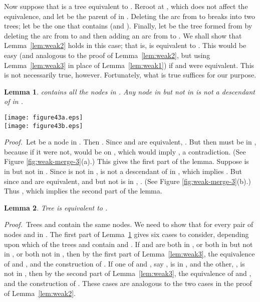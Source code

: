 \documentclass[twoside,leqno,twocolumn]{article}
\newtheorem{lemma}{Lemma}
\newcommand{\proof}{\noindent \emph{Proof.}\ }
\newcommand{\proofend}{\\}
\begin{document}
Now suppose that  is a tree equivalent to .  Reroot  at , which does not affect the equivalence, and let  be the parent of  in . Deleting the arc from  to  breaks  into two trees; let  be the one that contains  (and ).  Finally, let  be the tree formed from  by deleting the arc from  to  and then adding an arc from  to . We shall show that Lemma~\ref{lem:weak2} holds in this case; that is,  is equivalent to .  This would be easy (and analogous to the proof of Lemma~\ref{lem:weak2}, but using Lemma~\ref{lem:weak3} in place of Lemma~\ref{lem:weak1}) if  and  were equivalent.  This is not necessarily true, however.  Fortunately, what is true suffices for our purpose.

\begin{lemma}
\label{lem:weak4}  contains all the nodes in .  Any node in  but not in  is not a descendant of  in .
\end{lemma}

\begin{figure*}\begin{center}
\resizebox{.65\textwidth}{!} {\texttt{[image: figure43a.eps]}}\\
\vspace{1cm}
\resizebox{.65\textwidth}{!} {\texttt{[image: figure43b.eps]}}
\end{center}
\caption{\label{fig:weak-merge-3} Proof of Lemma~\ref{lem:weak4}.
Node ,  is the child of  in  that is an ancestor of , and  is the parent of  in .
(a) Assuming  is not in  implies , a contradiction. (b) If  is in  but not in  then
.}
\end{figure*}

\proof Let  be a node in . Then .  Since  and  are equivalent, .  But then  must be in , because if it were not,  would be on ,  which would imply
, a contradiction. (See Figure \ref{fig:weak-merge-3}(a).) This gives the first part of the lemma.  Suppose  is in  but not in .  Since  is not in ,  is not a descendant of  in , which implies .  But since  and  are equivalent, and  but not  is in , . (See Figure \ref{fig:weak-merge-3}(b).) Thus , which implies the second part of the lemma. \proofend

\begin{lemma}\label{lem:weak5} Tree  is equivalent to .
\end{lemma}
\proof Trees  and  contain the same nodes.  We need to show that  for every pair of nodes  and  in .  The first part of Lemma~\ref{lem:weak4} gives six cases to consider, depending upon which of the trees  and  contain  and .  If  and  are both in , or both in  but not in , or both not in , then  by the first part of Lemma~\ref{lem:weak3}, the equivalence of  and , and the construction of .  If one of  and , say , is in , and the other, , is not in , then  by the second part of Lemma~\ref{lem:weak3}, the equivalence of  and , and the construction of .  These cases are analogous to the two cases in the proof of Lemma~\ref{lem:weak2}.
\end{document}
